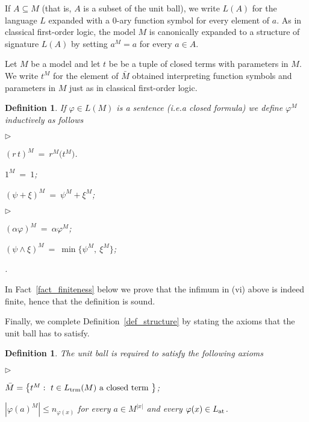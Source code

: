 \documentclass[12pt,letterpaper,oneside,reqno]{amsart}
\newcommand{\mylabel}[1]{{#1}\hfill}
\renewenvironment{itemize}
  {\begin{list}{$\triangleright$}{%
   \setlength{\parskip}{0mm}
   \setlength{\topsep}{.2\baselineskip}
   \setlength{\rightmargin}{0mm}
   \setlength{\listparindent}{0mm}
   \setlength{\itemindent}{0mm}
   \setlength{\labelwidth}{3ex}
   \setlength{\itemsep}{.2\baselineskip}
   \setlength{\parsep}{.2\baselineskip}
   \setlength{\partopsep}{0mm}
   \setlength{\labelsep}{1ex}
   \setlength{\leftmargin}{\labelwidth+\labelsep}
   \let\makelabel\mylabel}}{%
   \end{list}}
\theoremstyle{plain}
\newtheorem{definition}[theorem]{Definition}
\theoremstyle{remark}
\begin{document}
If $A\subseteq M$ (that is, $A$ is a subset of the unit ball), we write $L(A)$ for the language $L$ expanded with a $0$-ary function symbol for every element of $a$.
As in classical first-order logic, the model $M$ is canonically expanded to a structure of signature $L(A)$ by setting $a^M=a$ for every $a\in A$.

Let $M$ be a model and let $t$ be be a tuple of closed terms with parameters in $M$.
We write $t^M$ for the element of $\bar M$ obtained interpreting function symbols and parameters in $M$ just as in classical first-order logic.

\begin{definition}\label{def_semantic}
  If $\varphi\in L(M)$ is a sentence (i.e.\@ a closed formula) we define $\varphi^M$ inductively as follows

  \begin{minipage}[t]{.4\textwidth}
    \begin{itemize}
      \item[i.] $(r\,t)^M\ =\  r^M\big(t^M\big)$.
      \item[ii.] $1^M\ =\ 1$;
      \item[iii.] $(\psi+\xi)^M\ =\ \psi^M+\xi^M$;
    \end{itemize}
  \end{minipage}
  \begin{minipage}[t]{.59\textwidth}
    \begin{itemize}
      \item[iv.] $(\alpha\varphi)^M\ =\ \alpha\varphi^M$;
      \item[v.] $(\psi\wedge\xi)^M\ =\ \min\big\{\psi^M,\ \xi^M\big\}$;
      \item[vi.]  \noindent{}.
    \end{itemize}
  \end{minipage}
\end{definition}
\medskip

In Fact~\ref{fact_finiteness} below we prove that the infimum in (vi) above is indeed finite, hence that the definition is sound.

Finally, we complete Definition~\ref{def_structure} by stating the axioms that the unit ball has to satisfy.

\begin{definition}\label{def_unitball}
  The unit ball is required to satisfy the following axioms
  \begin{itemize}
    \item[1.] $\bar M=\big\{t^M:\ t\in L_{\rm trm}(M) \textrm{ a closed term }\big\}$;
    \item[2.] $|\varphi(a)^M|\le n_{\varphi(x)}$ for every $a\in M^{|x|}$ and every $\varphi(x)\in L_{\rm at}$.
  \end{itemize}
\end{definition}
\end{document}
